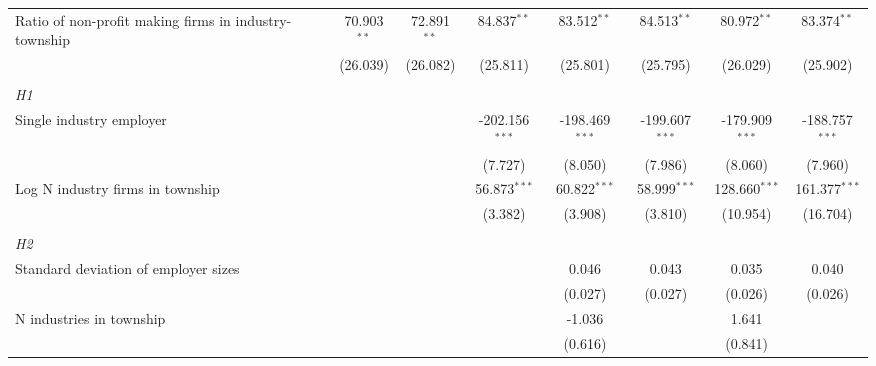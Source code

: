\begin{tabular}{lcccccccc}
   Ratio of non-profit making firms in industry-township &                 & 70.903$^{**}$   & 72.891$^{**}$   & 84.837$^{**}$    & 83.512$^{**}$    & 84.513$^{**}$    & 80.972$^{**}$    & 83.374$^{**}$\\   
                                                         &                 & (26.039)        & (26.082)        & (25.811)         & (25.801)         & (25.795)         & (26.029)         & (25.902)\\   
\hdashline %
\\[0.1ex] %
\emph{H1} \\ 
   Single industry employer                              &                 &                 &                 & -202.156$^{***}$ & -198.469$^{***}$ & -199.607$^{***}$ & -179.909$^{***}$ & -188.757$^{***}$\\   
                                                         &                 &                 &                 & (7.727)          & (8.050)          & (7.986)          & (8.060)          & (7.960)\\   
   Log N industry firms in township                      &                 &                 &                 & 56.873$^{***}$   & 60.822$^{***}$   & 58.999$^{***}$   & 128.660$^{***}$  & 161.377$^{***}$\\   
                                                         &                 &                 &                 & (3.382)          & (3.908)          & (3.810)          & (10.954)         & (16.704)\\   
\hdashline %
\\[0.1ex] %
\emph{H2} \\ 
   Standard deviation of employer sizes                  &                 &                 &                 &                  & 0.046            & 0.043            & 0.035            & 0.040\\   
                                                         &                 &                 &                 &                  & (0.027)          & (0.027)          & (0.026)          & (0.026)\\   
   N industries in township                              &                 &                 &                 &                  & -1.036           &                  & 1.641            &   \\   
                                                         &                 &                 &                 &                  & (0.616)          &                  & (0.841)          &   \\   

\end{tabular}
